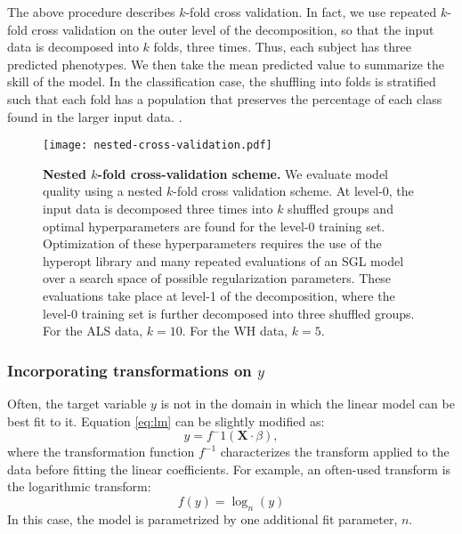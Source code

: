 The above procedure describes $k$-fold cross validation. In fact,
we use repeated $k$-fold cross validation on the outer level of the
decomposition, so that the input data is decomposed into $k$ folds,
three times. Thus, each subject has three predicted phenotypes. We then
take the mean predicted value to summarize the skill of the model.
In the classification case, the shuffling into folds is stratified such
that each fold has a population that preserves the percentage of each
class found in the larger input data.
.

\begin{figure}[!h]
    \centering
    \texttt{[image: nested-cross-validation.pdf]}
    \caption{{\bf Nested $k$-fold cross-validation scheme.}
        We evaluate model quality using a nested $k$-fold cross
        validation scheme. At level-0, the input data is decomposed
        three times into $k$ shuffled groups and optimal hyperparameters
        are found for the level-0 training set. Optimization of these
        hyperparameters requires the use of the hyperopt library and
        many repeated evaluations of an SGL model over a search space
        of possible regularization parameters. These evaluations take
        place at level-1 of the decomposition, where the level-0 training
        set is further decomposed into three shuffled groups.
        For the ALS data, $k=10$. For the WH data, $k=5$.
    }
    \label{fig:cross-val}
\end{figure}

\subsubsection*{Incorporating transformations on $y$}

Often, the target variable $y$ is not in the domain in which the linear model
can be best fit to it. Equation \ref{eq:lm} can be slightly modified as:
\begin{equation}
y = f^-1(\mathbf{X} \cdot \beta),
\label{eq:lm}
\end{equation}
where the transformation function $f^{-1}$ characterizes the transform applied
to the data before fitting the linear coefficients. For example, an often-used
transform is the logarithmic transform:
\begin{equation}
f(y) = \log_n(y)
\label{eq:log_nonlinearity}
\end{equation}
In this case, the model is parametrized by one additional fit parameter, $n$.


